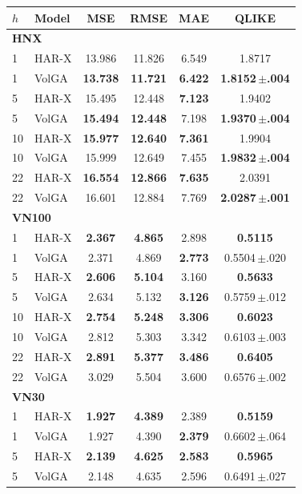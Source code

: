 \begin{tabular}{llcccc}
\toprule
$h$ & Model & MSE & RMSE & MAE & QLIKE \\
\midrule
\multicolumn{6}{l}{\textbf{HNX}} \\
1 & HAR-X & 13.986 & 11.826 & 6.549 & 1.8717 \\
1 & VolGA & \textbf{13.738} & \textbf{11.721} & \textbf{6.422} & \textbf{1.8152\,$\pm$.004} \\
5 & HAR-X & 15.495 & 12.448 & \textbf{7.123} & 1.9402 \\
5 & VolGA & \textbf{15.494} & \textbf{12.448} & 7.198 & \textbf{1.9370\,$\pm$.004} \\
10 & HAR-X & \textbf{15.977} & \textbf{12.640} & \textbf{7.361} & 1.9904 \\
10 & VolGA & 15.999 & 12.649 & 7.455 & \textbf{1.9832\,$\pm$.004} \\
22 & HAR-X & \textbf{16.554} & \textbf{12.866} & \textbf{7.635} & 2.0391 \\
22 & VolGA & 16.601 & 12.884 & 7.769 & \textbf{2.0287\,$\pm$.001} \\
\midrule
\multicolumn{6}{l}{\textbf{VN100}} \\
1 & HAR-X & \textbf{2.367} & \textbf{4.865} & 2.898 & \textbf{0.5115} \\
1 & VolGA & 2.371 & 4.869 & \textbf{2.773} & 0.5504\,$\pm$.020 \\
5 & HAR-X & \textbf{2.606} & \textbf{5.104} & 3.160 & \textbf{0.5633} \\
5 & VolGA & 2.634 & 5.132 & \textbf{3.126} & 0.5759\,$\pm$.012 \\
10 & HAR-X & \textbf{2.754} & \textbf{5.248} & \textbf{3.306} & \textbf{0.6023} \\
10 & VolGA & 2.812 & 5.303 & 3.342 & 0.6103\,$\pm$.003 \\
22 & HAR-X & \textbf{2.891} & \textbf{5.377} & \textbf{3.486} & \textbf{0.6405} \\
22 & VolGA & 3.029 & 5.504 & 3.600 & 0.6576\,$\pm$.002 \\
\midrule
\multicolumn{6}{l}{\textbf{VN30}} \\
1 & HAR-X & \textbf{1.927} & \textbf{4.389} & 2.389 & \textbf{0.5159} \\
1 & VolGA & 1.927 & 4.390 & \textbf{2.379} & 0.6602\,$\pm$.064 \\
5 & HAR-X & \textbf{2.139} & \textbf{4.625} & \textbf{2.583} & \textbf{0.5965} \\
5 & VolGA & 2.148 & 4.635 & 2.596 & 0.6491\,$\pm$.027 \\

\end{tabular}
